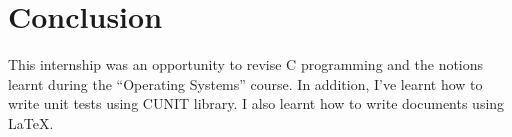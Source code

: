 \documentclass[11pt]{article}
\begin{document}
\tableofcontents





\section{Conclusion}

This internship was an opportunity to revise C programming and the notions learnt during the ``Operating Systems'' course.
In addition, I've learnt how to write unit tests using CUNIT library.
I also learnt how to write documents using \LaTeX.





\newpage
\appendix

\end{document}
